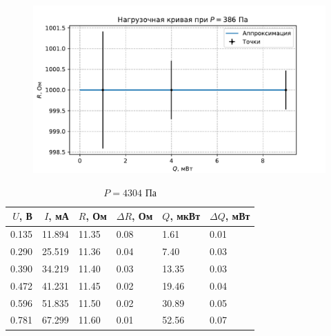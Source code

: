\begin{figure}[H]\centering\includegraphics[width=\textwidth]{graphs/RQ385.5933585713642.pdf}\end{figure}\begin{table}[H]
\centering
\caption{$P = 4304$ Па}
\begin{tabular}{rrllll}
\hline
 $U$, В &  $I$, мА &     $R$, Ом & $\Delta R$, Ом &     $Q$, мкВт & $\Delta Q$, мВт \\ \hline
0.135 & 11.894 & 11.35 &           0.08 &  1.61 &            0.01 \\ \hline
0.290 & 25.519 & 11.36 &           0.04 &  7.40 &            0.03 \\ \hline
0.390 & 34.219 & 11.40 &           0.03 & 13.35 &            0.03 \\ \hline
0.472 & 41.231 & 11.45 &           0.02 & 19.46 &            0.04 \\ \hline
0.596 & 51.835 & 11.50 &           0.02 & 30.89 &            0.05 \\ \hline
0.781 & 67.299 & 11.60 &           0.01 & 52.56 &            0.07 \\ \hline
\end{tabular}
\end{table}
